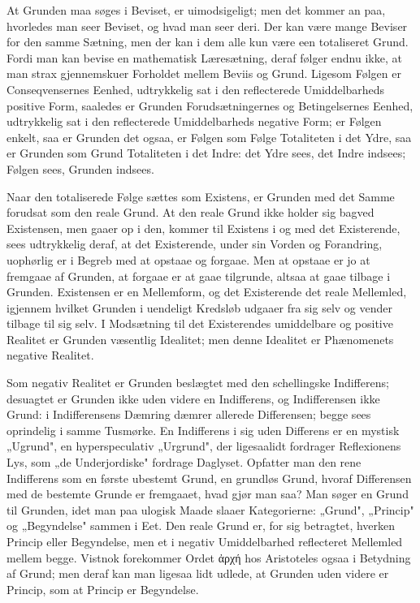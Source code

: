 \documentclass[12pt]{book}
\newcommand{\opage}[1]{\marginnote{\footnotesize\textit{[#1]}}}
\begin{document}
At Grunden maa søges i Beviset, er uimodsigeligt; men det kommer an paa, hvorledes
man seer Beviset, og hvad man seer deri. Der kan være mange Beviser for den samme
Sætning, men der kan i dem alle kun være een totaliseret Grund. Fordi man kan bevise
en mathematisk Læresætning,
\opage{90} deraf følger endnu ikke, at man strax gjennemskuer Forholdet mellem Beviis og Grund.
Ligesom Følgen er Conseqvensernes Eenhed, udtrykkelig sat i den reflecterede
Umiddelbarheds positive Form, saaledes er Grunden Forudsætningernes og
Betingelsernes Eenhed, udtrykkelig sat i den reflecterede Umiddelbarheds negative
Form; er Følgen enkelt, saa er Grunden det ogsaa, er Følgen som Følge Totaliteten i
det Ydre, saa er Grunden som Grund Totaliteten i det Indre: det Ydre sees, det Indre
indsees; Følgen sees, Grunden indsees.

Naar den totaliserede Følge sættes som Existens, er Grunden med det Samme forudsat
som den reale Grund. At den reale Grund ikke holder sig bagved Existensen, men gaaer
op i den, kommer til Existens i og med det Existerende, sees udtrykkelig deraf, at
det Existerende, under sin Vorden og Forandring, uophørlig er i Begreb med at opstaae
og forgaae. Men at opstaae er jo at fremgaae af Grunden, at forgaae er at gaae
tilgrunde, altsaa at gaae tilbage i Grunden. Existensen er en Mellemform, og det
Existerende det reale Mellemled, igjennem hvilket Grunden i uendeligt Kredsløb
udgaaer fra sig selv og vender tilbage til sig selv. I Modsætning til det Existerendes
umiddelbare og positive Realitet er Grunden væsentlig Idealitet; men denne Idealitet
er Phænomenets negative Realitet.

Som negativ Realitet er Grunden beslægtet med den schellingske Indifferens;
desuagtet er Grunden ikke uden videre en Indifferens, og Indifferensen ikke Grund: i
Indifferensens Dæmring dæmrer allerede Differensen; begge sees oprindelig i samme
Tusmørke. En Indifferens i sig uden Differens er en mystisk „Ugrund", en
hyperspeculativ „Urgrund", der ligesaalidt fordrager Reflexionens Lys, som „de
Underjordiske" fordrage Daglyset. Opfatter man den rene Indifferens som en første
ubestemt Grund, en grundløs Grund, hvoraf Differensen med de bestemte Grunde er
\opage{91} fremgaaet, hvad gjør man saa? Man søger en Grund til Grunden, idet man paa ulogisk
Maade slaaer Kategorierne: „Grund", „Princip" og „Begyndelse" sammen i Eet. Den reale
Grund er, for sig betragtet, hverken Princip eller Begyndelse, men et i negativ
Umiddelbarhed reflecteret Mellemled mellem begge. Vistnok forekommer Ordet ἀρχή hos
Aristoteles ogsaa i Betydning af Grund; men deraf kan man ligesaa lidt udlede, at
Grunden uden videre er Princip, som at Princip er Begyndelse.
\end{document}
